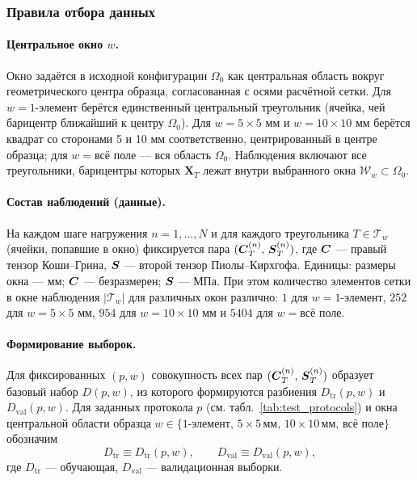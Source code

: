 \subsubsection{Правила отбора данных}
\paragraph{Центральное окно $w$.}
Окно задаётся в исходной конфигурации $\Omega_0$ как центральная область вокруг геометрического центра образца, согласованная с осями расчётной сетки.
Для $w=\text{1-элемент}$ берётся единственный центральный треугольник (ячейка, чей барицентр ближайший к центру $\Omega_0$).
Для $w=5\times5$ мм и $w=10\times10$ мм берётся квадрат со сторонами 5 и 10 мм соответственно, центрированный в центре образца; для $w=\text{всё поле}$ — вся область $\Omega_0$.
Наблюдения включают все треугольники, барицентры которых $\mathbf{X}_T$ лежат внутри выбранного окна $\mathcal{W}_w\subset\Omega_0$.

\paragraph{Состав наблюдений (данные).}
На каждом шаге нагружения $n=1,\dots,N$ и для каждого треугольника $T\in\mathcal{T}_w$ (ячейки, попавшие в окно) фиксируется пара $(\boldsymbol{C}_T^{(n)},\,\boldsymbol{S}_T^{(n)})$, 
где $\boldsymbol{C}$ — правый тензор Коши–Грина, $\boldsymbol{S}$ — второй тензор Пиолы–Кирхгофа.
Единицы: размеры окна — мм; $\boldsymbol{C}$ — безразмерен; $\boldsymbol{S}$ — МПа. 
При этом количество элементов сетки в окне наблюдения $|\mathcal{T}_w|$ для различных окон различно: 
$1$ для $w=\text{1-элемент}$, $252$ для $w=5\times5$ мм, $954$ для $w=10\times10$ мм и $5404$ для $w=\text{всё поле}$.

\paragraph{Формирование выборок.}
Для фиксированных $(p,w)$ совокупность всех пар $(\boldsymbol{C}_T^{(n)},\,\boldsymbol{S}_T^{(n)})$ образует базовый набор $D(p,w)$, из которого формируются разбиения $D_{\mathrm{tr}}(p,w)$ и $D_{\mathrm{val}}(p,w)$.
Для заданных протокола $p$ (см. табл.~\ref{tab:test_protocols}) 
и окна центральной области образца 
$w\in\{\text{1-элемент},\,5\times5\,\text{мм},\,10\times10\,\text{мм},\,\text{всё поле}\}$ обозначим
\[
  D_{\mathrm{tr}}\equiv D_{\mathrm{tr}}(p,w),\qquad D_{\mathrm{val}}\equiv D_{\mathrm{val}}(p,w),
\]
где $D_{\mathrm{tr}}$ — обучающая, $D_{\mathrm{val}}$ — валидационная выборки.

